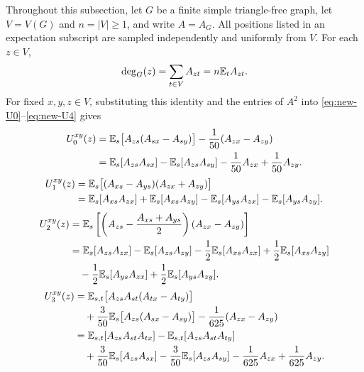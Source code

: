 Throughout this subsection, let $G$ be a finite simple triangle-free
graph, let $V=V(G)$ and $n=|V|\geq1$, and write $A=A_G$.
All positions listed in an expectation subscript are sampled
independently and uniformly from $V$.
For each $z\in V$,
\begin{equation}\label{eq:degree-as-expectation}
\deg_G(z)=\sum_{t\in V}A_{zt}=n\mathbb E_tA_{zt}.
\end{equation}
For fixed $x,y,z\in V$, substituting this identity and the entries of
$A^2$ into \eqref{eq:new-U0}--\eqref{eq:new-U4} gives
\begin{align}
U_0^{xy}(z)
&=\mathbb E_s\big[A_{zs}(A_{sx}-A_{sy})\big]
  -\frac1{50}(A_{zx}-A_{zy})\notag\\
&=\mathbb E_s[A_{zs}A_{sx}]-\mathbb E_s[A_{zs}A_{sy}]
  -\frac1{50}A_{zx}+\frac1{50}A_{zy}.
\label{eq:U0-expectation}
\end{align}
\begin{align}
U_1^{xy}(z)
&=\mathbb E_s\big[(A_{xs}-A_{ys})(A_{zx}+A_{zy})\big]\notag\\
&=\mathbb E_s[A_{xs}A_{zx}]+\mathbb E_s[A_{xs}A_{zy}]
  -\mathbb E_s[A_{ys}A_{zx}]-\mathbb E_s[A_{ys}A_{zy}].
\label{eq:U1-expectation}
\end{align}
\begin{align}
U_2^{xy}(z)
&=\mathbb E_s\left[
\left(A_{zs}-\frac{A_{xs}+A_{ys}}2\right)(A_{zx}-A_{zy})\right]
\notag\\
&=\mathbb E_s[A_{zs}A_{zx}]-\mathbb E_s[A_{zs}A_{zy}]
  -\frac12\mathbb E_s[A_{xs}A_{zx}]+\frac12\mathbb E_s[A_{xs}A_{zy}]
\notag\\
&\quad-\frac12\mathbb E_s[A_{ys}A_{zx}]+\frac12\mathbb E_s[A_{ys}A_{zy}].
\label{eq:U2-expectation}
\end{align}
\begin{align}
U_3^{xy}(z)
&=\mathbb E_{s,t}\big[A_{zs}A_{st}(A_{tx}-A_{ty})\big]\notag\\
&\quad+\frac3{50}\mathbb E_s\big[A_{zs}(A_{sx}-A_{sy})\big]
  -\frac1{625}(A_{zx}-A_{zy})\notag\\
&=\mathbb E_{s,t}[A_{zs}A_{st}A_{tx}]-\mathbb E_{s,t}[A_{zs}A_{st}A_{ty}]
\notag\\
&\quad+\frac3{50}\mathbb E_s[A_{zs}A_{sx}]
  -\frac3{50}\mathbb E_s[A_{zs}A_{sy}]
  -\frac1{625}A_{zx}+\frac1{625}A_{zy}.
\label{eq:U3-expectation}
\end{align}

